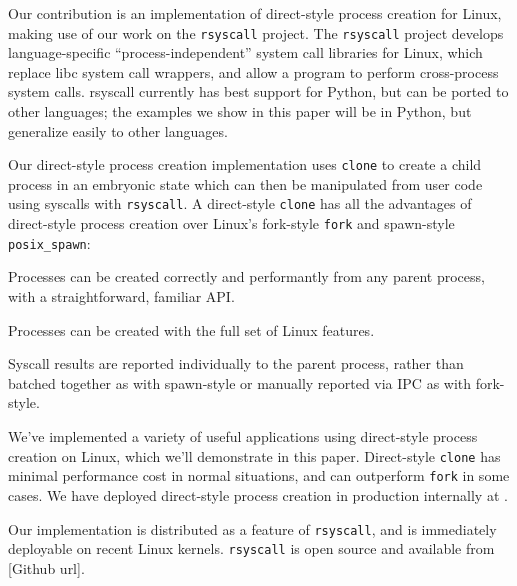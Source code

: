 \documentclass[letterpaper,twocolumn,10pt]{article}
\begin{document}
Our contribution is an implementation of direct-style process creation for Linux,
making use of our work on the \texttt{rsyscall} project.
The \texttt{rsyscall} project develops language-specific ``process-independent'' system call libraries for Linux,
which replace libc system call wrappers, and allow a program to perform cross-process system calls.
rsyscall currently has best support for Python,
but can be ported to other languages;
the examples we show in this paper will be in Python,
but generalize easily to other languages.

Our direct-style process creation implementation uses \texttt{clone} to create a child process in an embryonic state
which can then be manipulated from user code using syscalls with \texttt{rsyscall}.
A direct-style \texttt{clone} has all the advantages of direct-style process creation
over Linux's fork-style \texttt{fork} and spawn-style \texttt{posix\_spawn}:
\begin{compactitem}
\item
  Processes can be created correctly and performantly from any parent process,
  with a straightforward, familiar API.
\item
  Processes can be created with the full set of Linux features.
\item
  Syscall results are reported individually to the parent process,
  rather than batched together as with spawn-style or manually reported via IPC as with fork-style.
\end{compactitem}

We've implemented a variety of useful applications using direct-style process creation on Linux,
which we'll demonstrate in this paper.
Direct-style \texttt{clone} has minimal performance cost in normal situations,
and can outperform \texttt{fork} in some cases.
We have deployed direct-style process creation in production internally at \twosigma.

Our implementation is distributed as a feature of \texttt{rsyscall},
and is immediately deployable on recent Linux kernels.
\texttt{rsyscall} is open source and available from
[Github url].
\end{document}
